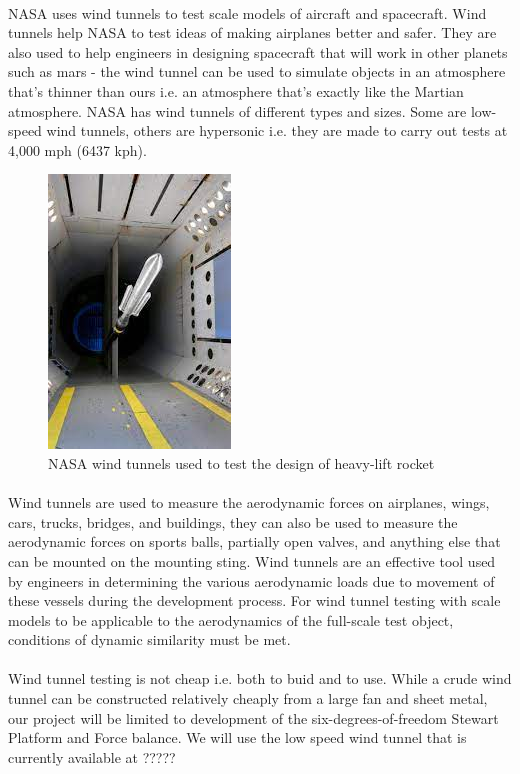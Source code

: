 \paragraph{}NASA uses wind tunnels to test scale models of aircraft and spacecraft. Wind tunnels help NASA to test ideas of making airplanes better and safer. They are also used to help engineers in designing spacecraft that will work in other planets such as mars - the wind tunnel can be used to simulate objects in an atmosphere that's thinner than ours i.e. an atmosphere that's exactly like the Martian atmosphere. NASA has wind tunnels of different types and sizes. Some are low-speed wind tunnels, others are hypersonic i.e. they are made to carry out tests at 4,000 mph (6437 kph).
\begin{figure}[!h]
\hfill\includegraphics{Figures/Fig4}\hspace*{\hfill}
\caption{NASA wind tunnels used to test the design of heavy-lift rocket}
\end{figure}
\paragraph{}Wind tunnels are used to measure the aerodynamic forces on airplanes, wings, cars, trucks, bridges, and buildings, they can also be used to measure the
aerodynamic forces on sports balls, partially open valves, and anything else that can be mounted on the mounting sting. Wind tunnels are an effective tool used by engineers in determining the various aerodynamic loads due to movement of these vessels during the development process.
For wind tunnel testing with scale models to be applicable to the aerodynamics of the full-scale test object, conditions of dynamic similarity must be met.
\paragraph{}Wind tunnel testing is not cheap i.e. both to buid and to use. While a crude wind tunnel can be constructed relatively cheaply from a large fan and
sheet metal, our project will be limited to development of the six-degrees-of-freedom Stewart Platform and Force balance. We will use the low speed wind tunnel that is currently available at ?????
